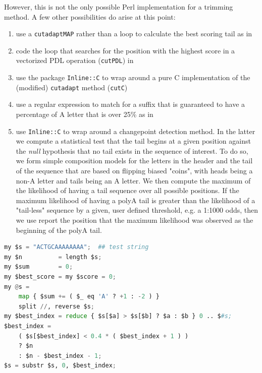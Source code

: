 \documentclass[10pt]{article}
\begin{document}
\newpage
However, this is not the only possible Perl implementation for a trimming method. A few other possibilities do arise at this point:
\begin{enumerate}
\item use a \texttt{cutadaptMAP} rather than a loop to calculate the best scoring tail as in 
\item code the loop that searches for the position with the highest score in a vectorized PDL operation (\texttt{cutPDL}) in 
\item use the package \texttt{Inline::C} to wrap around a pure C implementation of the (modified) \texttt{cutadapt} method (\texttt{cutC})
\item use a regular expression to match for a suffix that is guaranteed to have a percentage of A letter that
is over 25\% as in 
\item use \texttt{Inline::C} to wrap around a changepoint detection method. In the latter we compute a statistical test that the tail begins at a given position against the \textit{null} hypothesis that no tail exists in the sequence of interest. To do so, we form simple composition models for the letters in the header and the tail of the sequence that are based on flipping biased "coins", with heads being a non-A letter and tails being an A letter. We then compute the maximum of the likelihood of having a tail sequence over all possible positions. If the maximum likelihood of having a polyA tail is greater than the likelihood of a "tail-less" sequence by a given, user defined threshold, e.g. a 1:1000 odds, then we use report the position that the maximum likelihood was observed as the beginning of the polyA tail. 
\end{enumerate}
\noindent\hspace{0.15\linewidth}\begin{minipage}{0.70\textwidth}
\begin{lstlisting}[language=Python,basicstyle=\footnotesize,frame=none,caption={A \texttt{map} for \texttt{cutadapt}.},label={lst:CutadaptMap},captionpos=b]
my $s = "ACTGCAAAAAAAA";  ## test string  
my $n          = length $s;
my $sum        = 0;
my $best_score = my $score = 0;
my @s =
    map { $sum += ( $_ eq 'A' ? +1 : -2 ) }
    split //, reverse $s;
my $best_index = reduce { $s[$a] > $s[$b] ? $a : $b } 0 .. $#s;
$best_index =
    ( $s[$best_index] < 0.4 * ( $best_index + 1 ) )
    ? $n
    : $n - $best_index - 1;
$s = substr $s, 0, $best_index;
    
\end{lstlisting}
\end{minipage}
\end{document}

